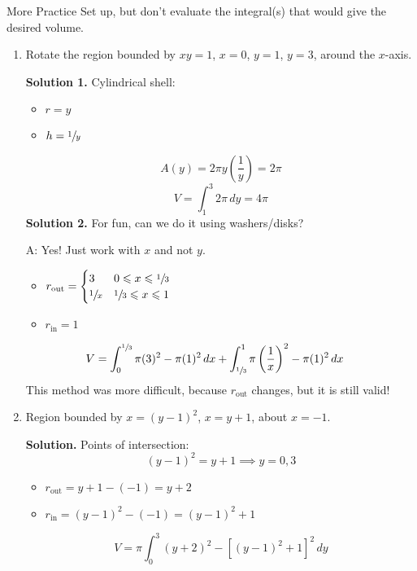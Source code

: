 \begin{Example}{More Practice}{}
    Set up, but don't evaluate the integral(s) that would give
    the desired volume.

    \begin{enumerate}[label=(\roman*)]
        \item Rotate the region bounded by $ xy=1 $, $ x=0 $, $ y=1 $, $ y=3 $,
              around the $ x $-axis.

              \textbf{Solution 1.} Cylindrical shell:
              \begin{itemize}
                  \item $ r=y $
                  \item $ h=\sfrac{1}{y} $
              \end{itemize}
              \[ A(y)=2\pi y\left( \frac{1}{y}  \right)=2\pi \]
              \[ V=\int_{1}^{3} 2\pi\, d{y}=4\pi \]
              \textbf{Solution 2.} For fun, can we do it using washers/disks?

              A\@: Yes! Just work with $ x $ and not $ y $.
              \begin{itemize}
                  \item $ \displaystyle  r_{\text{out}}=\begin{cases}
                                3            & 0\leqslant x\leqslant \sfrac{1}{3}   \\
                                \sfrac{1}{x} & \sfrac{1}{3} \leqslant x \leqslant 1
                            \end{cases} $
                  \item $ r_{\text{in}}=1 $
              \end{itemize}
              \begin{align*}
                  V
                   & =\int_{0}^{\sfrac{1}{3}} \pi(3)^2-\pi(1)^2\, d{x}
                  +\int_{\sfrac{1}{3}}^{1} \pi\left( \frac{1}{x} \right)^2-\pi(1)^2\, d{x}
              \end{align*}
              This method was more difficult, because $ r_{\text{out}} $ changes, but it is still valid!

        \item Region bounded by $ x=(y-1)^2 $, $ x=y+1 $, about $ x=-1 $.

              \textbf{Solution.} Points of intersection:
              \[ (y-1)^2=y+1\implies y=0,3 \]
              \begin{itemize}
                  \item $ r_{\text{out}}=y+1-(-1)=y+2 $
                  \item $ r_{\text{in}}=(y-1)^2-(-1)=(y-1)^2+1 $
              \end{itemize}
              \[ V=\pi \int_{0}^{3} (y+2)^2-\left[ (y-1)^2+1 \right]^2\, d{y}  \]
    \end{enumerate}
\end{Example}

